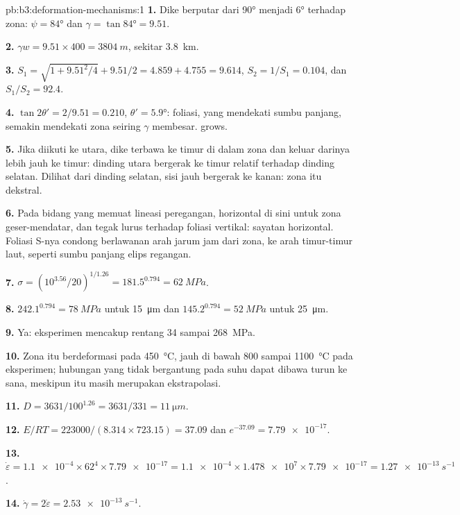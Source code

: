 \begin{solution}{pb:b3:deformation-mechanisms:1}
\textbf{1.} Dike berputar dari \ang{90} menjadi \ang{6} terhadap zona: $\psi =
\ang{84}$ dan $\gamma = \tan\ang{84} = 9.51$.

\textbf{2.} $\gamma w = 9.51\times400 = \qty{3804}{m}$, sekitar \qty{3.8}{km}.

\textbf{3.} $S_1 = \sqrt{1 + 9.51^2/4} + 9.51/2 = 4.859 + 4.755 = 9.614$,
$S_2 = 1/S_1 = 0.104$, dan $S_1/S_2 = 92.4$.

\textbf{4.} $\tan2\theta' = 2/9.51 = 0.210$, $\theta' = \ang{5.9}$: foliasi,
yang mendekati sumbu panjang, semakin mendekati zona seiring $\gamma$ membesar.
grows.

\textbf{5.} Jika diikuti ke utara, dike terbawa ke timur di dalam zona dan
keluar darinya lebih jauh ke timur: dinding utara bergerak ke timur relatif
terhadap dinding selatan. Dilihat dari dinding selatan, sisi jauh bergerak ke
kanan: zona itu dekstral.

\textbf{6.} Pada bidang yang memuat lineasi peregangan, horizontal di sini
untuk zona geser-mendatar, dan tegak lurus terhadap foliasi vertikal: sayatan
horizontal. Foliasi S-nya condong berlawanan arah jarum jam dari zona, ke arah
timur-timur laut, seperti sumbu panjang elips regangan.

\textbf{7.} $\sigma = (10^{3.56}/20)^{1/1.26} = 181.5^{0.794} = \qty{62}{MPa}$.

\textbf{8.} $242.1^{0.794} = \qty{78}{MPa}$ untuk \qty{15}{\micro m} dan
$145.2^{0.794} = \qty{52}{MPa}$ untuk \qty{25}{\micro m}.

\textbf{9.} Ya: eksperimen mencakup rentang \num{34} sampai \qty{268}{MPa}.

\textbf{10.} Zona itu berdeformasi pada \qty{450}{\celsius}, jauh di bawah 800 sampai
\qty{1100}{\celsius} pada eksperimen; hubungan yang tidak bergantung pada
suhu dapat dibawa turun ke sana, meskipun itu masih
merupakan ekstrapolasi.

\textbf{11.} $D = 3631/100^{1.26} = 3631/331 = \qty{11}{\micro m}$.

\textbf{12.} $E/RT = 223000/(8.314\times723.15) = 37.09$ dan $e^{-37.09} =
\num{7.79e-17}$.

\textbf{13.} $\dot\varepsilon = \num{1.1e-4}\times62^4\times\num{7.79e-17} =
\num{1.1e-4}\times\num{1.478e7}\times\num{7.79e-17} = \qty{1.27e-13}{s^{-1}}$.

\textbf{14.} $\dot\gamma = 2\dot\varepsilon = \qty{2.53e-13}{s^{-1}}$.


\end{solution}
